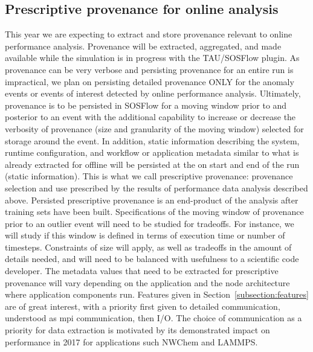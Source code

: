 \subsection{Prescriptive provenance for online analysis}
This year we are expecting to extract and store provenance relevant to online performance analysis.  Provenance will be extracted, aggregated, and made available while the simulation is in progress with the TAU/SOSFlow plugin.  As provenance can be very verbose and persisting provenance for an entire run is impractical, we plan on persisting detailed provenance ONLY for the anomaly events or events of interest detected by online performance analysis.  Ultimately, provenance is to be persisted in SOSFlow for a moving window prior to and posterior to an event with the additional capability to increase or decrease the verbosity of provenance (size and granularity of the moving window) selected for storage around the event.  In addition, static information describing the system, runtime configuration, and  workflow or application metadata similar to what is already extracted for offline will be persisted at the on start and end of the run (static information).  This is what we call prescriptive provenance: provenance selection and use prescribed by the results of performance data analysis described above.  Persisted prescriptive provenance is an end-product of the analysis after training sets have been built.
Specifications of the moving window of provenance prior to an outlier event will need to be studied for tradeoffs.  For instance, we will study if this window is defined in terms of execution time or number of timesteps.  Constraints of size will apply, as well as tradeoffs in the amount of details needed, and will need to be balanced with usefulness to a scientific code developer.
The metadata values that need to be extracted for prescriptive provenance will vary depending on the application and the node architecture where application components run.  Features given in Section~\ref{subsection:features} are of great interest, with a priority first given to detailed communication, understood as mpi communication, then I/O.  The choice of communication as a priority for data extraction is motivated by its demonstrated impact on performance in 2017 for applications such NWChem and LAMMPS. 
